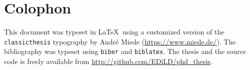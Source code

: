 
\pagestyle{empty}

\hfill

\vfill


\section*{Colophon}
This document was typeset in \LaTeX~using a customized version of the 
\texttt{classicthesis} typography by Andr\'{e} Miede (\url{https://www.miede.de/}).
The bibliography was typeset using \texttt{biber} and \texttt{biblatex}.
The thesis and the source code is freely available from \url{http://github.com/EDiLD/phd_thesis}.
